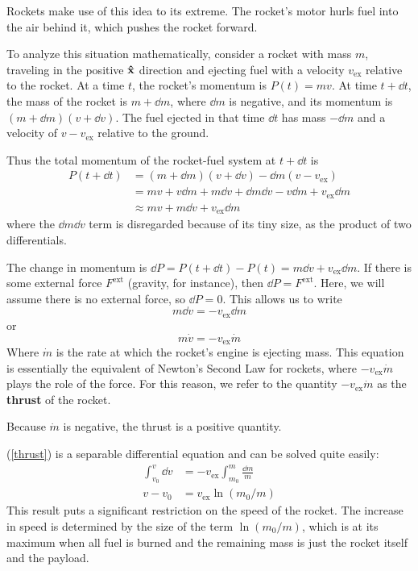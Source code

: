 Rockets make use of this idea to its extreme. The rocket's motor hurls fuel into the air behind it, which pushes the rocket forward.

To analyze this situation mathematically, consider a rocket with mass $m$, traveling in the positive $\mathbf{\hat{x}}$ direction and ejecting fuel with a velocity $v_\text{ex}$ relative to the rocket. At a time $t$, the rocket's momentum is $P(t) = mv$. At time $t + \dd t$, the mass of the rocket is $m + \dd m$, where $\dd m$ is negative, and its momentum is $(m + \dd m)(v + \dd v)$. The fuel ejected in that time $\dd t$ has mass $-\dd m$ and a velocity of $v - v_\text{ex}$ relative to the ground. 

Thus the total momentum of the rocket-fuel system at $t+\dd t$ is
\begin{align*}
    P(t + \dd t) &= (m+\dd m)(v+\dd v) - \dd m(v - v_\text{ex}) \\
    &= mv + v\dd m + m \dd v + \dd m \dd v - v\dd m + v_\text{ex}\dd m  \\
    &\approx mv + m \dd v + v_\text{ex}\dd m 
\end{align*}
where the $\dd m \dd v$ term is disregarded because of its tiny size, as the product of two differentials. 

The change in momentum is $\dd P = P(t + \dd t) - P(t) = m\dd v + v_\text{ex}\dd m$. If there is some external force $F^\text{ext}$ (gravity, for instance), then $\dd P = F^\text{ext}$. Here, we will assume there is no external force, so $\dd P = 0$. This allows us to write
\[ m \dd v = -v_\text{ex}\dd m \]
or
\begin{equation} \label{thrust}
     m \dot v = -v_\text{ex}\dot m 
\end{equation}
Where $\dot m$ is the rate at which the rocket's engine is ejecting mass. This equation is essentially the equivalent of Newton's Second Law for rockets, where $-v_\text{ex}\dot m$ plays the role of the force. For this reason, we refer to the quantity $-v_\text{ex}\dot m$ as the \textbf{thrust} of the rocket. 

Because $\dot m$ is negative, the thrust is a positive quantity. 

(\ref{thrust}) is a separable differential equation and can be solved quite easily:
\begin{align*}
    \int_{v_0}^v\dd v &= -v_\text{ex} \int_{m_0}^m \frac{\dd m}{m} \\
    v - v_0 &= v_\text{ex}\ln(m_0/m)
\end{align*}
This result puts a significant restriction on the speed of the rocket. The increase in speed is determined by the size of the term $\ln(m_0/m)$, which is at its maximum when all fuel is burned and the remaining mass is just the rocket itself and the payload. 

